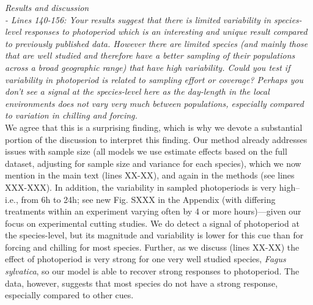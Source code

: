 \documentclass[11pt]{article}
\begin{document}
\emph{Results and discussion}\\
\emph{- Lines 140-156: Your results suggest that there is limited variability in species-level responses to photoperiod which is an interesting and unique result compared to previously published data. However there are limited species (and mainly those that are well studied and therefore have a better sampling of their populations across a broad geographic range) that have high variability. Could you test if variability in photoperiod is related to sampling effort or coverage? Perhaps you don’t see a signal at the species-level here as the day-length in the local environments does not vary very much between populations, especially compared to variation in chilling and forcing.}\\
We agree that this is a surprising finding, which is why we devote a substantial portion of the discussion to interpret this finding. Our method already addresses issues with sample size (all models we use estimate effects based on the full dataset, adjusting for sample size and variance for each species), which we now mention in the main text (lines XX-XX), and again in the methods (see lines XXX-XXX). In addition, the variability in sampled photoperiods is very high--i.e., from 6h to 24h; see new Fig. SXXX in the Appendix (with differing treatments within an experiment varying often by 4 or more hours)---given our focus on experimental cutting studies. We do detect a signal of photoperiod at the species-level, but its magnitude and variability is lower for this cue than for forcing and chilling for most species. Further, as we discuss (lines XX-XX) the effect of photoperiod is very strong for one very well studied species, \emph{Fagus sylvatica}, so our model is able to recover strong responses to photoperiod. The data, however, suggests that most species do not have a strong response, especially compared to other cues. \\

\end{document}

